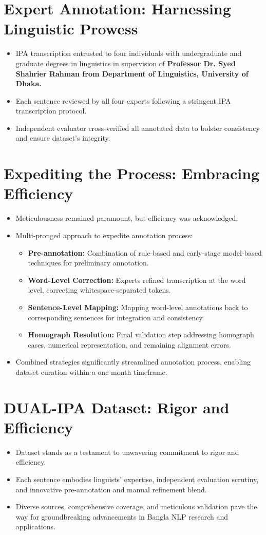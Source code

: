 \section{Expert Annotation: Harnessing Linguistic Prowess}
\begin{itemize}
    \item IPA transcription entrusted to four individuals with undergraduate and graduate degrees in linguistics in supervision of \textbf{Professor Dr. Syed Shahrier Rahman from Department of Linguistics, University of Dhaka.}
    \item Each sentence reviewed by all four experts following a stringent IPA transcription protocol.
    \item Independent evaluator cross-verified all annotated data to bolster consistency and ensure dataset's integrity.
\end{itemize}
\newpage
\section{Expediting the Process: Embracing Efficiency}
\begin{itemize}
    \item Meticulousness remained paramount, but efficiency was acknowledged.
    \item Multi-pronged approach to expedite annotation process:
    \begin{itemize}
        \item \textbf{Pre-annotation:} Combination of rule-based and early-stage model-based techniques for preliminary annotation.
        \item \textbf{Word-Level Correction:} Experts refined transcription at the word level, correcting whitespace-separated tokens.
        \item \textbf{Sentence-Level Mapping:} Mapping word-level annotations back to corresponding sentences for integration and consistency.
        \item \textbf{Homograph Resolution:} Final validation step addressing homograph cases, numerical representation, and remaining alignment errors.
    \end{itemize}
    \item Combined strategies significantly streamlined annotation process, enabling dataset curation within a one-month timeframe.
\end{itemize}

\section{DUAL-IPA Dataset: Rigor and Efficiency}
\begin{itemize}
    \item Dataset stands as a testament to unwavering commitment to rigor and efficiency.
    \item Each sentence embodies linguists' expertise, independent evaluation scrutiny, and innovative pre-annotation and manual refinement blend.
    \item Diverse sources, comprehensive coverage, and meticulous validation pave the way for groundbreaking advancements in Bangla NLP research and applications.
\end{itemize}


